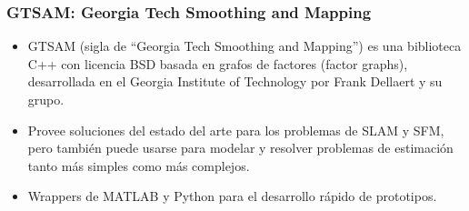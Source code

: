 \begin{frame}
    \frametitle{GTSAM: Georgia Tech Smoothing and Mapping}

    \begin{itemize}
        \item GTSAM (sigla de ``Georgia Tech Smoothing and Mapping'') es una biblioteca C++ con licencia BSD basada en grafos de factores (factor graphs), desarrollada en el Georgia Institute of Technology por Frank Dellaert y su grupo.
        \item Provee soluciones del estado del arte para los problemas de SLAM y SFM, pero también puede usarse para modelar y resolver problemas de estimación tanto más simples como más complejos.
        \item Wrappers de MATLAB y Python para el desarrollo rápido de prototipos.
    \end{itemize}

\end{frame}

